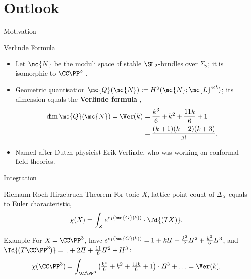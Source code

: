 \section{Outlook}

\begin{frame}{Motivation}
    \begin{block}{Verlinde Formula}
        \begin{itemize}
            \item Let $\mc{N}$ be the moduli space of stable $\SL_{2}$-bundles over $\Sigma_{2}$; it is isomorphic to $\CC\PP^{3}$ \cite{NR1969}.
            \item Geometric quantisation $\mc{Q}(\mc{N}) := H^{0}(\mc{N}; \mc{L}^{\otimes k})$; its dimension equals the \textbf{Verlinde formula} \cite{verlinde1988, JW1992},
            \begin{equation*}
                \begin{split}
                    \dim \mc{Q}(\mc{N}) = \Ver(k) &= \frac{k^{3}}{6} + k^{2} + \frac{11k}{6} + 1 \\
                    &= \frac{(k+1)(k+2)(k+3)}{3!}.
                \end{split}
            \end{equation*}
            \item Named after Dutch physicist Erik Verlinde, who was working on conformal field theories.
        \end{itemize}
    \end{block}
\end{frame}

\begin{frame}{Integration}
    \begin{block}{Riemann-Roch-Hirzebruch Theorem}
        For toric $X$, lattice point count of $\Delta_{X}$ equals to Euler characteristic,
        \vspace*{-12pt}
        $$ \chi(X) = \int_{X} e^{c_{1}( \mc{O}(k) )}\cdot \Td{(TX)}. $$
        \vspace*{-12pt}
    \end{block}
    \begin{block}{Example}
        For $X = \CC\PP^{3}$, have $e^{c_{1}(\mc{O}(k))} = 1 + kH + \tfrac{k^{2}}{2}H^{2} + \tfrac{k^{3}}{6}H^{3}$, and $\Td{(T\CC\PP^{3})} = 1 + 2H + \tfrac{11}{6}H^{2} + H^{3}$:
        $$ \chi(\CC\PP^{3}) = \int_{\CC\PP^{3}} \big( \tfrac{k^{3}}{6} + k^{2} + \tfrac{11k}{6} + 1 \big) \cdot H^{3} + \ldots = \Ver(k). $$
    \end{block}
\end{frame}

